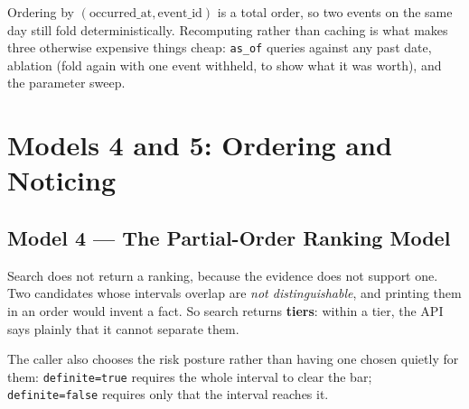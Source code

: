 \documentclass[11pt,a4paper]{article}
\begin{document}
Ordering by $(\text{occurred\_at}, \text{event\_id})$ is a total order, so
two events on the same day still fold deterministically. Recomputing rather
than caching is what makes three otherwise expensive things cheap:
\texttt{as\_of} queries against any past date, ablation (fold again with one
event withheld, to show what it was worth), and the parameter sweep.

\section{Models 4 and 5: Ordering and Noticing}
\label{sec:query}
\label{sec:integrity}

\subsection*{Model 4 --- The Partial-Order Ranking Model}

Search does not return a ranking, because the evidence does not support
one. Two candidates whose intervals overlap are \emph{not distinguishable},
and printing them in an order would invent a fact. So search returns
\textbf{tiers}: within a tier, the API says plainly that it cannot separate
them.

The caller also chooses the risk posture rather than having one chosen
quietly for them: \texttt{definite=true} requires the whole interval to
clear the bar; \texttt{definite=false} requires only that the interval
reaches it.
\end{document}

